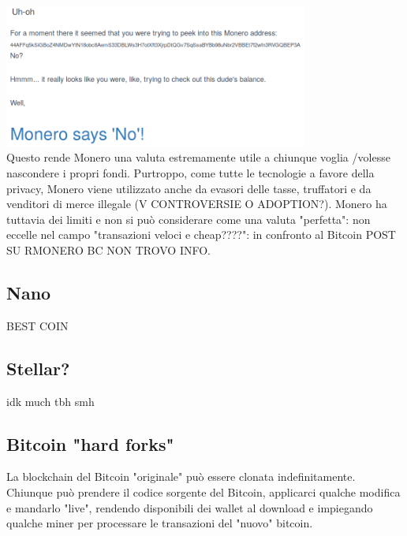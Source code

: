 \documentclass {article}
\begin{document}
\vspace {0.5cm}
\includegraphics [width = 10cm] {media/monero.png}
\vspace {0.5cm}
\\
Questo rende Monero una valuta estremamente utile a chiunque voglia /volesse nascondere i propri fondi.
Purtroppo, come tutte le tecnologie a favore della privacy, Monero viene utilizzato anche da evasori delle tasse, truffatori e da venditori di merce illegale (V CONTROVERSIE O ADOPTION?).
Monero ha tuttavia dei limiti e non si può considerare come una valuta "perfetta": non eccelle nel campo "transazioni veloci e cheap????": in confronto al Bitcoin POST SU RMONERO BC NON TROVO INFO.


\subsection {Nano}


BEST COIN


\subsection {Stellar?}


idk much tbh smh


\subsection {Bitcoin "hard forks"}


La blockchain del Bitcoin "originale" può essere clonata indefinitamente. Chiunque può prendere il codice sorgente del Bitcoin, applicarci qualche modifica e mandarlo "live", rendendo disponibili dei wallet al download e impiegando qualche miner per processare le transazioni del "nuovo" bitcoin.
\end{document}
